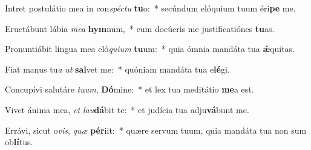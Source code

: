 \item Intret postulátio mea in con\textit{spéc}\textit{tu} \textbf{tu}o:~* secúndum elóquium tuum éri\textbf{pe} me.
\item Eructábunt lábia \textit{me}\textit{a} \textbf{hym}num,~* cum docúeris me justificatiónes \textbf{tu}as.
\item Pronuntiábit lingua mea eló\textit{qui}\textit{um} \textbf{tu}um:~* quia ómnia mandáta tua \textbf{ǽ}quitas.
\item Fiat manus tu\textit{a} \textit{ut} \textbf{sal}vet me:~* quóniam mandáta tua e\textbf{lé}gi.
\item Concupívi salutáre \textit{tu}\textit{um}, \textbf{Dó}mine:~* et lex tua meditátio \textbf{me}a est.
\item Vivet ánima mea, \textit{et} \textit{lau}\textbf{dá}bit te:~* et judícia tua adju\textbf{vá}bunt me.
\item Errávi, sicut o\textit{vis}, \textit{quæ} \textbf{pér}iit:~* quære servum tuum, quia mandáta tua non sum ob\textbf{lí}tus.
